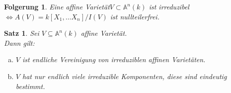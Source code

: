 \documentclass[a4paper,12pt]{report}
\theoremstyle{break}
\newtheorem{Satz}{Satz}
\newtheorem{Folg}[Def]{Folgerung}
\theoremstyle{nonumberbreak}
\theoremstyle{nonumberplain}
\newcommand{\A}{\mathbb{A}}
\begin{document}
\begin{Folg}
Eine affine Variet\"at$V\subset \A ^n(k)$ ist irreduzibel $\Leftrightarrow A(V) =k[X_1,\dots X_n]/I(V)$ ist nullteilerfrei.
\end{Folg}

\begin{Satz}
Sei $V\subseteq \A ^n(k)$ affine Variet\"at.\\
Dann gilt:\begin{enumerate}[a)]
\item
	$V$ ist endliche Vereinigung von irreduziblen affinen Variet\"aten.
\item
	$V$ hat nur endlich viele irreduzible Komponenten, diese sind eindeutig bestimmt.
\end{enumerate}\end{Satz}
\end{document}
